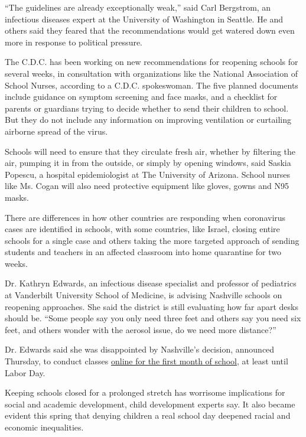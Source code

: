 ``The guidelines are already exceptionally weak,'' said Carl Bergstrom,
an infectious diseases expert at the University of Washington in
Seattle. He and others said they feared that the recommendations would
get watered down even more in response to political pressure.

The C.D.C. has been working on new recommendations for reopening schools
for several weeks, in consultation with organizations like the National
Association of School Nurses, according to a C.D.C. spokeswoman. The
five planned documents include guidance on symptom screening and face
masks, and a checklist for parents or guardians trying to decide whether
to send their children to school. But they do not include any
information on improving ventilation or curtailing airborne spread of
the virus.

Schools will need to ensure that they circulate fresh air, whether by
filtering the air, pumping it in from the outside, or simply by opening
windows, said Saskia Popescu, a hospital epidemiologist at The
University of Arizona. School nurses like Ms. Cogan will also need
protective equipment like gloves, gowns and N95 masks.

There are differences in how other countries are responding when
coronavirus cases are identified in schools, with some countries, like
Israel, closing entire schools for a single case and others taking the
more targeted approach of sending students and teachers in an affected
classroom into home quarantine for two weeks.

Dr. Kathryn Edwards, an infectious disease specialist and professor of
pediatrics at Vanderbilt University School of Medicine, is advising
Nashville schools on reopening approaches. She said the district is
still evaluating how far apart desks should be. ``Some people say you
only need three feet and others say you need six feet, and others wonder
with the aerosol issue, do we need more distance?''

Dr. Edwards said she was disappointed by Nashville's decision, announced
Thursday, to conduct classes
\href{https://www.tennessean.com/story/news/education/2020/07/09/metro-schools-academic-year-start-online-nashville-students/5383315002/}{online
for the first month of school}, at least until Labor Day.

Keeping schools closed for a prolonged stretch has worrisome
implications for social and academic development, child development
experts say. It also became evident this spring that denying children a
real school day deepened racial and economic inequalities.

